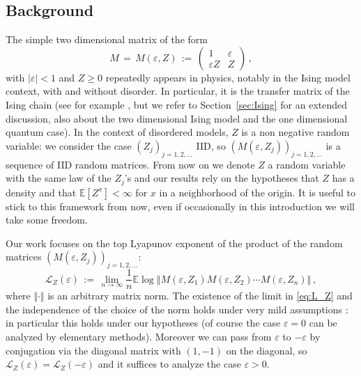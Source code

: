 \documentclass[reqno,11pt]{amsart}
\numberwithin{equation}{section}
\newcommand{\cL}{{\ensuremath{\mathcal L}} }
\newcommand{\bbE}{{\ensuremath{\mathbb E}} }
\newcommand{\gep}{\varepsilon}       %
\begin{document}
\subsection{Background}
The simple two dimensional matrix of the form  
\begin{equation}
\label{eq:keyM}
M\, =\,M(\gep, Z)\, :=\, 
\begin{pmatrix}
1& \gep\\ 
\gep Z  & Z
\end{pmatrix}\, , 
\end{equation}
with $\vert \gep \vert < 1$ and $Z\ge 0$ repeatedly appears in physics, notably in the Ising model context, with and without disorder.
In particular, it is the transfer matrix of the Ising chain 
(see for example \cite{cf:FV,cf:MWbook}, but we refer to Section~\ref{sec:Ising} for an extended discussion, also about the two dimensional Ising model and the one dimensional quantum case).
In the context of disordered models, $Z$ is a non negative random variable:  we consider the case $(Z_j)_{j=1,2, \ldots}$ IID, so $(M(\gep, Z_j))_{j=1,2, \ldots}$ is a sequence of IID random matrices.
From now on we denote $Z$ a random variable with the same law of the $Z_j$'s and our results rely on the hypotheses that $Z$ has a density and that $\bbE[Z^x]< \infty$ for $x$ in a neighborhood of the origin. It is useful to stick to this framework from now, even if occasionally in this introduction we will take some freedom.


Our work focuses on the top Lyapunov exponent of the product of the random matrices $(M(\gep, Z_j))_{j=1,2, \ldots}$:
\begin{equation}
\label{eq:L_Z}
	\cL_Z(\gep)\, :=\, \lim_{n \to \infty} \frac 1 n \bbE \log \left \Vert M(\gep , Z_1) M(\gep , Z_2) \cdots  M(\gep , Z_n)\right \Vert\, ,
\end{equation}
where $\Vert \cdot \Vert$ is an arbitrary matrix norm. The existence of the limit in \eqref{eq:L_Z} and the independence of the choice of the norm holds under very mild assumptions \cite{cf:BL}: in particular this holds under our hypotheses (of course the case $\gep=0$ can be analyzed by elementary methods). Moreover 
we can pass from $\gep$ to $-\gep$ by conjugation via the diagonal matrix with $(1,-1)$ on the diagonal, so 
$\cL_Z(\gep)=\cL_Z(-\gep)$ and it suffices to  analyze the case  $\gep > 0$. 
\end{document}
